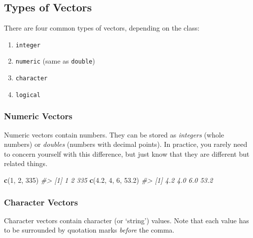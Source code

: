 \documentclass[
]{book}
\newenvironment{Shaded}{\begin{snugshade}}{\end{snugshade}}
\newcommand{\CommentTok}[1]{\textcolor[rgb]{0.56,0.35,0.01}{\textit{#1}}}
\newcommand{\DecValTok}[1]{\textcolor[rgb]{0.00,0.00,0.81}{#1}}
\newcommand{\FloatTok}[1]{\textcolor[rgb]{0.00,0.00,0.81}{#1}}
\newcommand{\KeywordTok}[1]{\textcolor[rgb]{0.13,0.29,0.53}{\textbf{#1}}}
\newcommand{\NormalTok}[1]{#1}
\providecommand{\tightlist}{%
  \setlength{\itemsep}{0pt}\setlength{\parskip}{0pt}}
\begin{document}
\hypertarget{types-of-vectors}{%
\subsection{Types of Vectors}\label{types-of-vectors}}

There are four common types of vectors, depending on the class:

\begin{enumerate}
\def\labelenumi{\arabic{enumi}.}
\tightlist
\item
  \texttt{integer}
\item
  \texttt{numeric} (same as \texttt{double})
\item
  \texttt{character}
\item
  \texttt{logical}
\end{enumerate}

\hypertarget{numeric-vectors}{%
\subsubsection*{Numeric Vectors}\label{numeric-vectors}}

Numeric vectors contain numbers. They can be stored as \emph{integers} (whole numbers) or \emph{doubles} (numbers with decimal points). In practice, you rarely need to concern yourself with this difference, but just know that they are different but related things.

\begin{Shaded}
\begin{Highlighting}[]
\KeywordTok{c}\NormalTok{(}\DecValTok{1}\NormalTok{, }\DecValTok{2}\NormalTok{, }\DecValTok{335}\NormalTok{)}
\CommentTok{#> [1]   1   2 335}
\KeywordTok{c}\NormalTok{(}\FloatTok{4.2}\NormalTok{, }\DecValTok{4}\NormalTok{, }\DecValTok{6}\NormalTok{, }\FloatTok{53.2}\NormalTok{)}
\CommentTok{#> [1]  4.2  4.0  6.0 53.2}
\end{Highlighting}
\end{Shaded}

\hypertarget{character-vectors}{%
\subsubsection*{Character Vectors}\label{character-vectors}}

Character vectors contain character (or `string') values. Note that each value has to be surrounded by quotation marks \emph{before} the comma.
\end{document}
